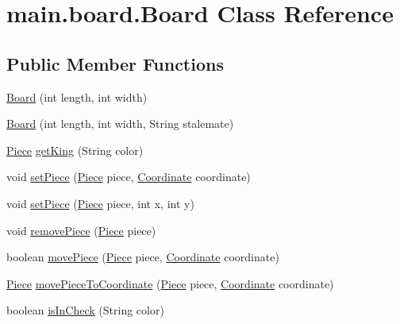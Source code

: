 \hypertarget{classmain_1_1board_1_1_board}{}\section{main.\+board.\+Board Class Reference}
\label{classmain_1_1board_1_1_board}
\subsection*{Public Member Functions}
\begin{DoxyCompactItemize}
\item 
\hyperlink{classmain_1_1board_1_1_board_afedcefaa4788e89abeb52d36e06e5c31}{Board} (int length, int width)
\item 
\hyperlink{classmain_1_1board_1_1_board_a7d213ce6f77da69d7fc906d337265189}{Board} (int length, int width, String stalemate)
\item 
\hyperlink{classmain_1_1pieces_1_1_piece}{Piece} \hyperlink{classmain_1_1board_1_1_board_ab42d3a7e267e5acb5ca76509a326ec59}{get\+King} (String color)
\item 
void \hyperlink{classmain_1_1board_1_1_board_ad75bd012fbde4f7baffd1a417c00a7d4}{set\+Piece} (\hyperlink{classmain_1_1pieces_1_1_piece}{Piece} piece, \hyperlink{classmain_1_1board_1_1_coordinate}{Coordinate} coordinate)
\item 
void \hyperlink{classmain_1_1board_1_1_board_adddfc2c7018880f34439dce2cb12bc00}{set\+Piece} (\hyperlink{classmain_1_1pieces_1_1_piece}{Piece} piece, int x, int y)
\item 
void \hyperlink{classmain_1_1board_1_1_board_a2d7676d389be445b683cd490fe99f1d0}{remove\+Piece} (\hyperlink{classmain_1_1pieces_1_1_piece}{Piece} piece)
\item 
boolean \hyperlink{classmain_1_1board_1_1_board_a5c942b1bb9899558644f3b0fe17933ef}{move\+Piece} (\hyperlink{classmain_1_1pieces_1_1_piece}{Piece} piece, \hyperlink{classmain_1_1board_1_1_coordinate}{Coordinate} coordinate)
\item 
\hyperlink{classmain_1_1pieces_1_1_piece}{Piece} \hyperlink{classmain_1_1board_1_1_board_a4767a869c5e1833d02a80dc1f2f34d06}{move\+Piece\+To\+Coordinate} (\hyperlink{classmain_1_1pieces_1_1_piece}{Piece} piece, \hyperlink{classmain_1_1board_1_1_coordinate}{Coordinate} coordinate)
\item 
boolean \hyperlink{classmain_1_1board_1_1_board_af60d46bc0ce03dba79376ea04e10db7a}{is\+In\+Check} (String color)
\item 

\end{DoxyCompactItemize}
